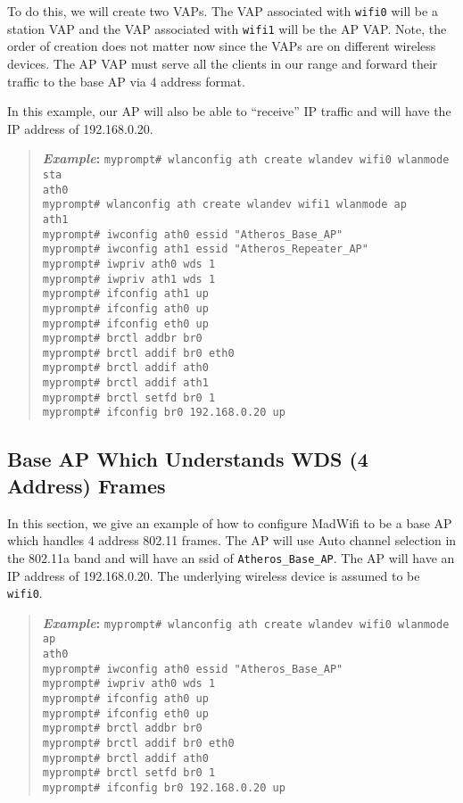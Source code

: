 \documentclass[10pt,fullpage]{article}
\newcommand{\mytt}[1]{{\texttt{#1}}}
\newcommand{\cmd}[1]{{\texttt{myprompt\# #1}}}
\newenvironment{example}{\begin{quote}\textbf{\textit{Example}:}}{\end{quote}}
\begin{document}
To do this, we will create two VAPs.  The VAP associated with
\mytt{wifi0} will be a station VAP and the VAP associated with
\mytt{wifi1} will be the AP VAP.  Note, the order of creation does not
matter now since the VAPs are on different wireless devices.  The AP
VAP must serve all the clients in our range and forward their traffic
to the base AP via 4 address format.  

In this example, our AP will also be able to ``receive'' IP traffic
and will have the IP address of 192.168.0.20.
\begin{example}
  \cmd{wlanconfig ath create wlandev wifi0 wlanmode sta}\\
  \mytt{ath0}\\
  \cmd{wlanconfig ath create wlandev wifi1 wlanmode ap}\\
  \mytt{ath1}\\
  \cmd{iwconfig ath0 essid "Atheros\_Base\_AP"}\\
  \cmd{iwconfig ath1 essid "Atheros\_Repeater\_AP"}\\
  \cmd{iwpriv ath0 wds 1}\\
  \cmd{iwpriv ath1 wds 1}\\
  \cmd{ifconfig ath1 up}\\
  \cmd{ifconfig ath0 up}\\
  \cmd{ifconfig eth0 up}\\
  \cmd{brctl addbr br0}\\
  \cmd{brctl addif br0 eth0}\\
  \cmd{brctl addif ath0}\\
  \cmd{brctl addif ath1}\\
  \cmd{brctl setfd br0 1}\\
  \cmd{ifconfig br0 192.168.0.20 up}
\end{example}

\subsection{Base AP Which Understands WDS (4 Address) Frames}
In this section, we give an example of how to configure MadWifi to be
a base AP which handles 4 address 802.11 frames.  The AP will use Auto
channel selection in the 802.11a band and will have an ssid of
\mytt{Atheros\_Base\_AP}. The AP will have an IP address of
192.168.0.20.  The underlying wireless device is assumed to be
\mytt{wifi0}.
\begin{example}
  \cmd{wlanconfig ath create wlandev wifi0 wlanmode ap}\\
  \mytt{ath0}\\
  \cmd{iwconfig ath0 essid "Atheros\_Base\_AP"}\\
  \cmd{iwpriv ath0 wds 1}\\
  \cmd{ifconfig ath0 up}\\
  \cmd{ifconfig eth0 up}\\
  \cmd{brctl addbr br0}\\
  \cmd{brctl addif br0 eth0}\\
  \cmd{brctl addif ath0}\\
  \cmd{brctl setfd br0 1}\\
  \cmd{ifconfig br0 192.168.0.20 up}
\end{example}
\end{document}
